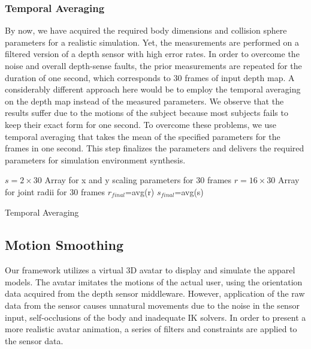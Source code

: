 \documentclass[number,preprint,review,12pt]{elsarticle}
\begin{document}
\doublespacing

\subsubsection{Temporal Averaging}
\label{subsec:4.3} 

By now, we have acquired the required body dimensions and collision sphere parameters for a realistic simulation. 
Yet, the measurements are performed on a filtered version of a depth sensor with high error rates. In order to overcome the noise and overall depth-sense faults,
 the prior measurements are repeated for the duration of one second, which corresponds to 30 frames of input depth map. 
A considerably different approach here would be to employ the temporal averaging on the depth map instead of the measured parameters. 
We observe that the results suffer due to the motions of the subject because most subjects fails to keep their exact form for one second. 
To overcome these problems, we use temporal averaging that takes the mean of the specified parameters for the frames in one second. 
This step finalizes the parameters and delivers the required parameters for simulation environment synthesis. 

\singlespacing

\begin{algorithm}
\DontPrintSemicolon %
$s=2 \times 30 $ Array for x and y scaling parameters for 30 frames\;
$r=16 \times 30 $ Array for joint radii for 30 frames\;
$r_\textit{final}$=avg(r)\;
$s_\textit{final}$=avg(s)\;
\caption{Temporal Averaging}
\label{algo:temporal_averaging}
\end{algorithm}

\doublespacing


\subsection{Motion Smoothing}
\label{subsec:Motion}
Our framework utilizes a virtual 3D avatar to display and simulate the apparel models. The avatar imitates the motions of the actual user, using the orientation data acquired from the depth sensor middleware. However, application of the raw data from the sensor causes unnatural movements due to the noise in the sensor input, self-occlusions of the body and inadequate IK solvers.  In order to present a more realistic avatar animation, a series of filters and constraints are applied to the sensor data. 
\end{document}
